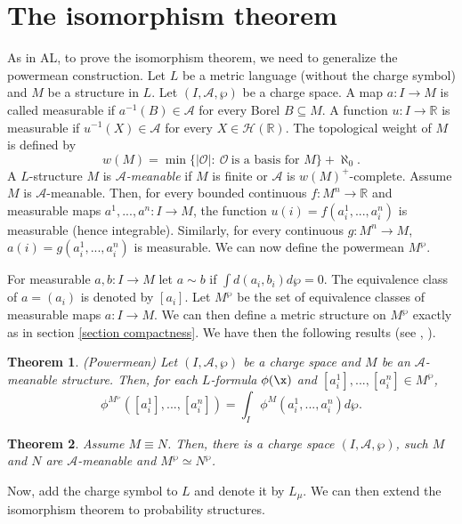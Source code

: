 \documentclass[12pt]{article}
\newtheorem{theorem}{Theorem}[section]
\def\Rn{\mathbb R}
\begin{document}
\section{The isomorphism theorem}
As in AL, to prove the isomorphism theorem, we need to generalize the powermean construction.
Let $L$ be a metric language (without the charge symbol) and $M$ be a structure in $L$. Let $(I,\mathcal A,\wp)$ be a charge space.
A map $a:I\rightarrow M$ is called measurable if $a^{-1}(B)\in\mathcal A$ for every Borel $B\subseteq M$.
A function $u:I\rightarrow\Rn$ is measurable if $u^{-1}(X)\in\mathcal A$ for every $X\in\mathcal H(\Rn)$.
The topological weight of $M$ is defined by
$$w(M)=\min\{|\mathcal{O}|:\ \mathcal{O}\ \mbox{is\ a\ basis\ for } M \}+\aleph_0.$$
A $L$-structure $M$ is \emph{$\mathcal A$-meanable} if $M$ is finite or $\mathcal{A}$ is $w(M)^+$-complete.
Assume $M$ is $\mathcal A$-meanable.
Then, for every bounded continuous $f:M^n\rightarrow\Rn$ and measurable maps $a^1,...,a^n:I\rightarrow M$,
the function $u(i)=f(a^1_i,...,a^n_i)$ is measurable (hence integrable).
Similarly, for every continuous $g:M^n\rightarrow M$,\ \ $a(i)=g(a^1_i,...,a^n_i)$ is measurable.
We can now define the powermean $M^\wp$.

For measurable $a,b:I\rightarrow M$ let $a\sim b$ if $\int d(a_i,b_i)d\wp=0$. The equivalence class of $a=(a_i)$ is denoted by $[a_i]$.
Let $M^{\wp}$ be the set of equivalence classes of measurable maps $a:I\rightarrow M$.
We can then define a metric structure on $M^{\wp}$ exactly as in section \ref{section compactness}.
We have then the following results (see \cite{ACMT}, \cite{Isomorphism}).

\begin{theorem} \label{powermean} \emph{(Powermean)}
Let $(I,\mathcal A,\wp)$ be a charge space and $M$ be an $\mathcal A $-meanable structure.
Then, for each $L$-formula $\phi(\x)$ and $[a^1_i],...,[a^n_i]\in M^{\wp}$,
$$\phi^{M^{\wp}}([a^1_i],...,[a^n_i])=\int_I\phi^M(a^1_i,...,a^n_i)d\wp.$$
\end{theorem}

\begin{theorem} \label{isomorphism}
Assume $M\equiv N$. Then, there is a charge space $(I,\mathcal A,\wp)$, such $M$ and $N$
are $\mathcal A$-meanable and $M^{\wp}\simeq N^{\wp}$.
\end{theorem}

Now, add the charge symbol to $L$ and denote it by $L_\mu$.
We can then extend the isomorphism theorem to probability structures.
\end{document}
